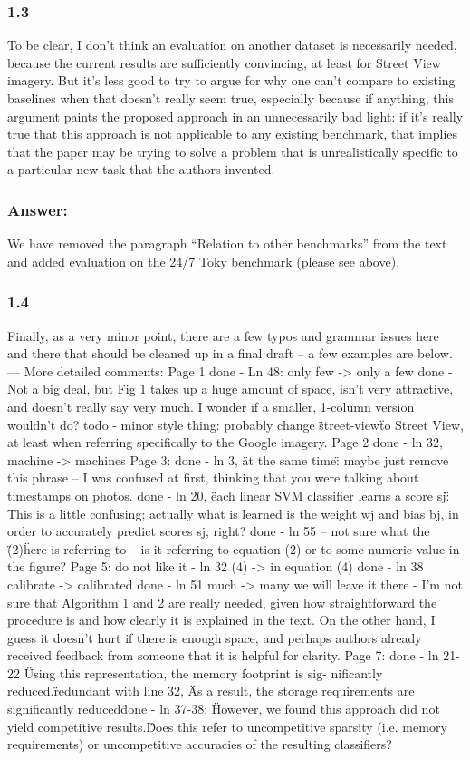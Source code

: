 \documentclass[a4paper,12pt]{article}
\begin{document}
\subsubsection*{1.3}
To be clear, I don't think an evaluation on another dataset is necessarily needed, because the current results are sufficiently convincing, at least for Street View imagery. But it's less good to try to argue for why one can't compare to existing baselines when that doesn't really seem true, especially because if anything, this argument paints the proposed approach in an unnecessarily bad light: if it's really true that this approach is not applicable to any existing benchmark, that implies that the paper may be trying to solve a problem that is unrealistically specific to a particular new task that the authors invented.

\subsubsection*{Answer:}
We have removed the paragraph “Relation to other benchmarks” from the text and added evaluation on the 24/7 Toky benchmark (please see above).

\subsubsection*{1.4}
Finally, as a very minor point, there are a few typos and grammar issues here and there that should be cleaned up in a final draft -- a few examples are below.
---
More detailed comments:
Page 1
done - Ln 48: only few -> only a few
done - Not a big deal, but Fig 1 takes up a huge amount of space, isn't very attractive, and doesn't really say very much. I wonder if a smaller, 1-column version wouldn't do?
todo - minor style thing: probably change \"street-view\" to Street View, at least when referring specifically to the Google imagery.
Page 2
done - ln 32, machine -> machines
Page 3:
done - ln 3, \"at the same time\": maybe just remove this phrase -- I
was confused at first, thinking that you were talking about timestamps on photos.
done - ln 20, \"each linear SVM classifier learns a score sj\": This is a little confusing; actually what is learned is the weight wj and bias bj, in order to accurately predict scores sj, right?
done - ln 55 -- not sure what the \"(2)\" here is referring to -- is it referring to equation (2) or to some numeric value in the figure?
Page 5:
do not like it - ln 32 (4) -> in equation (4)
done - ln 38 calibrate -> calibrated
done - ln 51 much -> many
we will leave it there - I'm not sure that Algorithm 1 and 2 are really needed, given how straightforward the procedure is and how clearly it is explained in the text. On the other hand,
I guess it doesn't hurt if there is enough space, and perhaps authors already received feedback from someone that it is helpful for clarity.
Page 7:
done - ln 21-22 \"Using this representation, the memory footprint is sig- nificantly reduced.\" redundant with line 32, \"As a result, the storage requirements are significantly reduced\"
done - ln 37-38: \"However, we found this approach did not yield competitive results.\" Does this refer to uncompetitive sparsity (i.e. memory requirements) or uncompetitive accuracies of the resulting classifiers?
\end{document}
